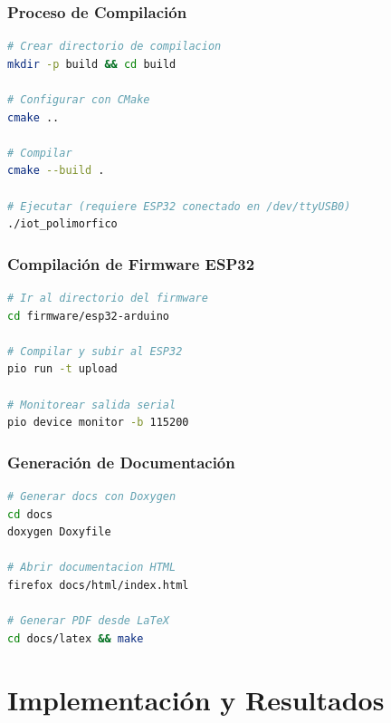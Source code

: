 \documentclass[conference]{IEEEtran}
\begin{document}
\subsubsection{Proceso de Compilación}

\vspace{0.3cm}
\begin{lstlisting}[language=bash]
# Crear directorio de compilacion
mkdir -p build && cd build

# Configurar con CMake
cmake ..

# Compilar
cmake --build .

# Ejecutar (requiere ESP32 conectado en /dev/ttyUSB0)
./iot_polimorfico
\end{lstlisting}
\vspace{0.2cm}

\subsubsection{Compilación de Firmware ESP32}

\vspace{0.3cm}
\begin{lstlisting}[language=bash]
# Ir al directorio del firmware
cd firmware/esp32-arduino

# Compilar y subir al ESP32
pio run -t upload

# Monitorear salida serial
pio device monitor -b 115200
\end{lstlisting}
\vspace{0.2cm}

\subsubsection{Generación de Documentación}

\vspace{0.3cm}
\begin{lstlisting}[language=bash]
# Generar docs con Doxygen
cd docs
doxygen Doxyfile

# Abrir documentacion HTML
firefox docs/html/index.html

# Generar PDF desde LaTeX
cd docs/latex && make
\end{lstlisting}
\vspace{0.2cm}

\section{Implementación y Resultados}
\end{document}
